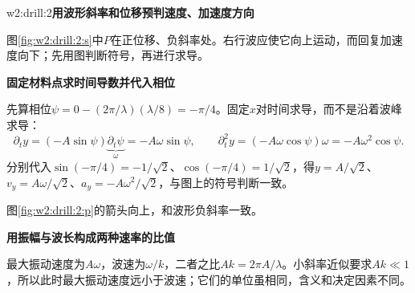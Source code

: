 \begin{drillsolution}{w2:drill:2}\textbf{用波形斜率和位移预判速度、加速度方向}\par\nobreak
图\ref{fig:w2:drill:2:s}中$P$在正位移、负斜率处。右行波应使它向上运动，而回复加速度向下；先用图判断符号，再进行求导。


\par\medskip{}\noindent\textbf{固定材料点求时间导数并代入相位}\par\nobreak
先算相位$\psi=0-(2\pi/\lambda)(\lambda/8)=-\pi/4$。固定$x$对时间求导，而不是沿着波峰求导：
\[
\partial_ty=(-A\sin\psi)\underbrace{\partial_t\psi}_{\omega}
=-A\omega\sin\psi,\qquad
\partial_t^2y=(-A\omega\cos\psi)\omega=-A\omega^2\cos\psi.
\]
分别代入$\sin(-\pi/4)=-1/\sqrt2$、$\cos(-\pi/4)=1/\sqrt2$，得$y=A/\sqrt2$、$v_y=A\omega/\sqrt2$、$a_y=-A\omega^2/\sqrt2$，与图上的符号判断一致。

图\ref{fig:w2:drill:2:p}的箭头向上，和波形负斜率一致。

\par\medskip{}\noindent\textbf{用振幅与波长构成两种速率的比值}\par\nobreak
最大振动速度为$A\omega$，波速为$\omega/k$，二者之比$Ak=2\pi A/\lambda$。小斜率近似要求$Ak\ll1$，所以此时最大振动速度远小于波速；它们的单位虽相同，含义和决定因素不同。\end{drillsolution}
